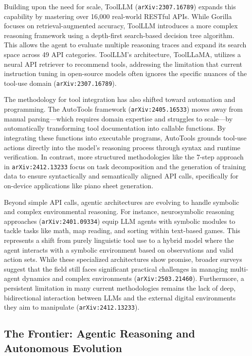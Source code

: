 \documentclass[11pt]{article}
\begin{document}
Building upon the need for scale, ToolLLM (\texttt{arXiv:2307.16789}) expands this capability by mastering over 16,000 real-world RESTful APIs. While Gorilla focuses on retrieval-augmented accuracy, ToolLLM introduces a more complex reasoning framework using a depth-first search-based decision tree algorithm. This allows the agent to evaluate multiple reasoning traces and expand its search space across 49 API categories. ToolLLM's architecture, ToolLLaMA, utilizes a neural API retriever to recommend tools, addressing the limitation that current instruction tuning in open-source models often ignores the specific nuances of the tool-use domain (\texttt{arXiv:2307.16789}).

The methodology for tool integration has also shifted toward automation and programming. The AutoTools framework (\texttt{arXiv:2405.16533}) moves away from manual parsing—which requires domain expertise and struggles to scale—by automatically transforming tool documentation into callable functions. By integrating these functions into executable programs, AutoTools grounds tool-use actions directly into the model's reasoning process through syntax and runtime verification. In contrast, more structured methodologies like the 7-step approach in \texttt{arXiv:2412.13233} focus on task decomposition and the generation of training data to ensure syntactically and semantically aligned API calls, specifically for on-device applications like piano sheet generation.

Beyond simple API calls, agentic architectures are evolving to handle symbolic and complex environmental reasoning. For instance, neurosymbolic reasoning approaches (\texttt{arXiv:2401.09334}) equip LLM agents with symbolic modules to tackle tasks like math, map reading, and sorting within text-based games. This represents a shift from purely linguistic tool use to a hybrid model where the agent interacts with a symbolic environment based on observations and valid action sets. While these specialized architectures show promise, broader surveys suggest that the field still faces significant practical challenges in managing multi-agent dynamics and complex environments (\texttt{arXiv:2503.21460}). Furthermore, a persistent limitation in many current methodologies remains the lack of deep, bidirectional interaction between LLMs and the external digital environments they aim to manipulate (\texttt{arXiv:2412.13233}).

\subsection{The Frontier: Agentic Reasoning and Autonomous Evolution}
\end{document}
